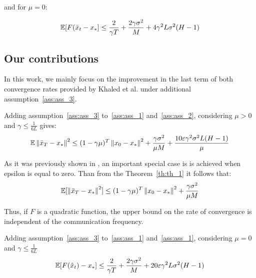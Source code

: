 and for $\mu = 0$:

\begin{equation}
\mathbb{E}[F(\bar{x}_t - x_*] \leq \frac{2}{\gamma T} + \frac{2 \gamma \sigma^2}{M} + 4 \gamma^2 L \sigma^2 (H-1)
\end{equation}

\subsection{Our contributions}
In this work, we mainly focus on the improvement in the last term of both convergence rates provided by Khaled et al. under additional assumption~\ref{ass:ass_3}.

\begin{theorem} \label{th:th_1}
    Adding assumption~\ref{ass:ass_3} to~\ref{ass:ass_1} and~\ref{ass:ass_2}, 
    considering $\mu > 0$ and $\gamma \leq \frac{1}{6 L}$ gives:
    \begin{align}
        \mathbb{E} \left\|\bar{x}_T - x_*\right\|^2
        \leq
        (1 - \gamma \mu)^T \left\|x_0 - x_*\right\|^2 
        + \frac{\gamma \sigma^2}{\mu M} 
        + \frac{10 \varepsilon \gamma^2 \sigma^2 L (H-1)}{\mu}
    \end{align}
\end{theorem}

\begin{corollary} \label{}
    As it was previously shown in \cite{Woodworth}, an important special case is is achieved when epsilon is equal to zero. Than from the Theorem~\ref{th:th_1} it follows that:
    \begin{align}
        \mathbb{E}[\left\|\bar{x}_T - x_*\right\|^2]
        \leq
        (1 - \gamma \mu)^T \left\|x_0 - x_*\right\|^2 
        + \frac{\gamma \sigma^2}{\mu M}
    \end{align}
\end{corollary}

Thus, if $F$ is a quadratic function, the upper bound on the rate of convergence is independent of the communication frequency.

\begin{theorem} \label{th:th_2}
    Adding assumption~\ref{ass:ass_3} to~\ref{ass:ass_1} and~\ref{ass:ass_1}, 
    considering $\mu = 0$ and $\gamma \leq \frac{1}{6 L}$
    \begin{align}
        \mathbb{E}[F(\hat{x}_t) - x_*] \leq
        \frac{2}{\gamma T} + \frac{2 \gamma \sigma^2}{M} + 20 \varepsilon \gamma^2 L \sigma^2 (H-1)
    \end{align}
\end{theorem}